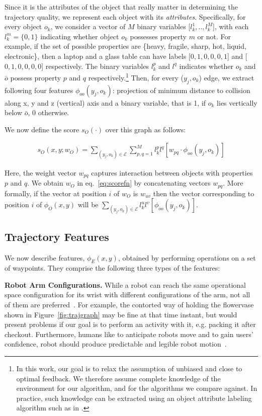 Since it is the attributes \cite{Koppula11} of the object that really matter in determining the trajectory quality, we represent each object with its \emph{attributes}.
Specifically, for every object $o_k$, we consider a vector of $M$ binary variables [$l_k^1,..,l_k^M$], with each $l_k^m = \{0,1\}$ indicating whether object $o_k$ possesses property $m$ or not. For example, if the set of possible properties are 
\{heavy, fragile, sharp, hot, liquid, electronic\}, then a laptop and a glass table can have labels [$0,1,0,0,0,1$] and [$0,1,0,0,0,0$] respectively. The binary variables $l_k^p$ and $l^q$ indicates whether $o_k$ and $\bar{o}$ possess property $p$ and $q$ 
respectively.\footnote{In this work, our goal is to relax the assumption of unbiased and close to optimal feedback. We therefore assume complete knowledge of the environment for our algorithm, and for the algorithms we compare against. In practice, such knowledge can be extracted using an object attribute labeling algorithm such as in \cite{Koppula11}.} Then, for every ($y_j,o_k$) edge, we extract following four features 
$\phi_{oo}(y_j, o_k)$: projection of minimum distance to collision along x, y and z (vertical) axis and a binary variable, that is 1, if $o_k$ lies vertically below $\bar{o}$, 
0 otherwise. 

We now define the score $s_O(\cdot)$ over this graph as follows:

\begin{align}
s_{O}(x,y;w_{O}) =   \sum_{(y_j,o_k)\in\mathcal{E}} \sum_{p,q=1}^M l_k^p l^q
[w_{pq}\cdot\phi_{oo}(y_j, o_k)]
\end{align}

Here, the weight vector $w_{pq}$ captures interaction between objects with properties $p$ and $q$. We obtain $w_O$ in eq.~\eqref{eq:scorefn} by concatenating vectors $w_{pq}$. More formally, if the vector at position $i$ of $w_{O}$ is $w_{uv}$ then the vector corresponding to position $i$ of $\phi_O(x,y)$
will be $\sum_{(y_j,o_k)\in\mathcal{E}} l_k^u l^v
[\phi_{oo}(y_j, o_k)]$. 

\subsection{Trajectory Features}

We now describe features, $\phi_{E}(x,y)$, obtained by performing operations on a set of waypoints. They comprise the following three types of the features:

\textbf{Robot Arm Configurations.} While a robot can reach the same operational space configuration for its wrist with different configurations of the arm, not all of them are preferred~\cite{Zacharias11}. For example, the contorted way of holding the flowervase shown in Figure~\ref{fig:trajgraph}
may be fine at that time instant, but would present problems if our goal is to perform an activity with it, e.g. packing it after checkout. Furthermore, humans like to anticipate robots move and to gain users' confidence, robot should produce predictable and legible robot motion~\citep{Dragan13b}. 

